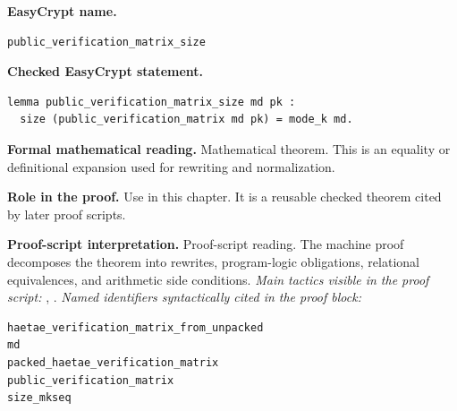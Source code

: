 \begin{formaltheorem}
\noindent\textbf{EasyCrypt name.}
\begin{lstlisting}[language=EasyCrypt,basicstyle=\ttfamily\scriptsize]
public_verification_matrix_size
\end{lstlisting}
\noindent\textbf{Checked EasyCrypt statement.}
\begin{lstlisting}[language=EasyCrypt,basicstyle=\ttfamily\scriptsize]
lemma public_verification_matrix_size md pk :
  size (public_verification_matrix md pk) = mode_k md.
\end{lstlisting}
\noindent\textbf{Formal mathematical reading.}
Mathematical theorem. This is an equality or definitional expansion used for rewriting and normalization.

\noindent\textbf{Role in the proof.}
Use in this chapter. It is a reusable checked theorem cited by later proof scripts.

\noindent\textbf{Proof-script interpretation.}
Proof-script reading. The machine proof decomposes the theorem into rewrites, program-logic obligations, relational equivalences, and arithmetic side conditions.
\emph{Main tactics visible in the proof script:} , .
\emph{Named identifiers syntactically cited in the proof block:}
\begin{lstlisting}[language=EasyCrypt,basicstyle=\ttfamily\scriptsize]
haetae_verification_matrix_from_unpacked
md
packed_haetae_verification_matrix
public_verification_matrix
size_mkseq
\end{lstlisting}

\end{formaltheorem}

